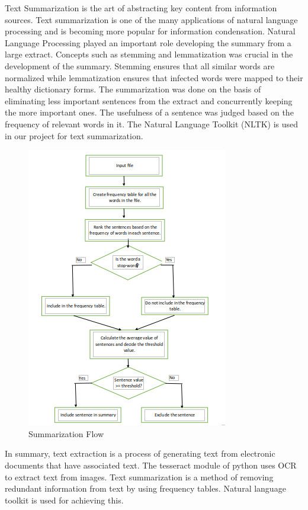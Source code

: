 Text Summarization is the art of abstracting key content from information sources. Text summarization is one of the many applications of natural language processing and is becoming more popular for information condensation. Natural Language Processing played an important role developing the summary from a large extract. Concepts such as stemming and lemmatization was crucial in the development of the summary. Stemming ensures that all similar words are normalized while lemmatization ensures that infected words were mapped to their healthy dictionary forms. The summarization was done on the basis of eliminating less important sentences from the extract and concurrently keeping the more important ones. The usefulness of a sentence was judged based on the frequency of relevant words in it. The Natural Language Toolkit (NLTK) is used in our project for text summarization.\\
\begin{figure}[H]
\centering
	\includegraphics[scale=1]{Figures/summarizer.png}	
	\caption{Summarization Flow}
	\label{fig:summarizer}
\end{figure}


\vspace{0.75cm}
In summary, text extraction is a process of generating text from electronic documents that have associated text. The tesseract module of python uses OCR to extract text from images. Text summarization is a method of removing redundant information from text by using frequency tables. Natural language toolkit is used for achieving this.
  